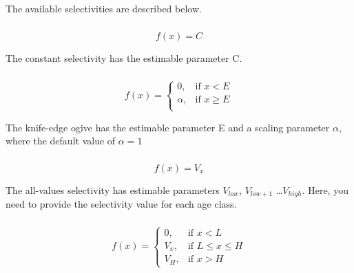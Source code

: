 The available selectivities are described below.

\subsubsection[Constant]{}

\begin{equation}
f(x)=C
\end{equation}

The constant selectivity has the estimable parameter C. 

\subsubsection[Knife-edge]{}

\begin{equation}
f(x)= \begin{cases}
  0, & \text{if $x < E$} \\
  \alpha, & \text{if $x \ge E$}\\ 
  \end{cases} 
\end{equation}

The knife-edge ogive has the estimable parameter E and a scaling parameter $\alpha$, where the default value of $\alpha = 1$

\subsubsection[All-values]{}

\begin{equation}
f(x)=V_x
\end{equation}

The all-values selectivity has estimable parameters $V_{low}$, $V_{low+1}$ \ldots $V_{high}$. Here, you need to provide the selectivity value for each age class.

\subsubsection[All-values-bounded]{}

\begin{equation}
f(x)=\begin{cases}
		 0, & \text{if $x < L$} \\
		 V_x, & \text{if $L \le x \le H$} \\
		 V_H, & \text{if $x > H$}
  \end{cases}
\end{equation}

